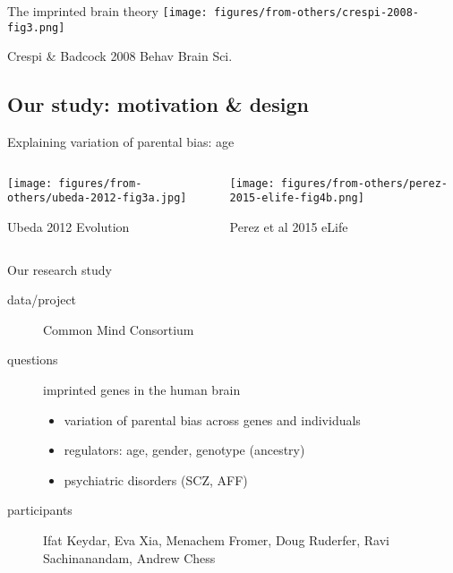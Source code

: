 \documentclass{beamer}
\begin{document}
\begin{frame}{The imprinted brain theory}
\texttt{[image: figures/from-others/crespi-2008-fig3.png]}
\vfill
{\tiny \raggedright{Crespi \& Badcock 2008 Behav Brain Sci.}}
\end{frame}

\subsection{Our study: motivation \& design}

\begin{frame}{Explaining variation of parental bias: age}
\begin{columns}[t]
\begin{column}{0.5\textwidth}

\texttt{[image: figures/from-others/ubeda-2012-fig3a.jpg]}

{\tiny Ubeda 2012 Evolution}
\end{column}

\begin{column}{0.5\textwidth}

\texttt{[image: figures/from-others/perez-2015-elife-fig4b.png]}

{\tiny Perez et al 2015 eLife}
\end{column}
\end{columns}
\end{frame}

\begin{frame}{Our research study}
\begin{description}
\item[data/project] Common Mind Consortium
\item[questions] imprinted genes in the human brain
\begin{itemize}
\item variation of parental bias across genes and individuals
\item regulators: age, gender, genotype (ancestry)
\item psychiatric disorders (SCZ, AFF)  
\end{itemize}
\item[participants] \alert{Ifat Keydar}, Eva Xia, Menachem Fromer, Doug Ruderfer, Ravi Sachinanandam, Andrew Chess
\end{description}
\end{frame}
\end{document}
